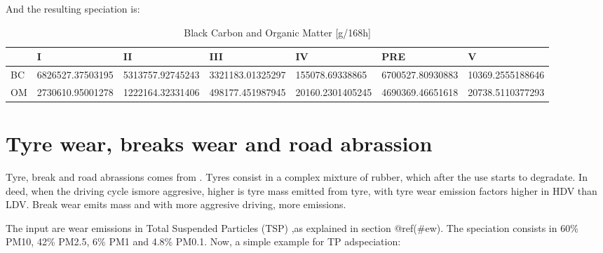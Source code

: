 \documentclass[12pt,graybox,envcountchap,sectrefs]{krantz}
\theoremstyle{definition}
\theoremstyle{definition}
\theoremstyle{definition}
\theoremstyle{remark}
\begin{document}
And the resulting speciation is:

\begin{table}

\caption{\label{tab:unnamed-chunk-96}Black Carbon and Organic Matter [g/168h]}
\centering
\begin{tabular}[t]{l|l|l|l|l|l|l}
\hline
  & I & II & III & IV & PRE & V\\
\hline
BC & 6826527.37503195 & 5313757.92745243 & 3321183.01325297 & 155078.69338865 & 6700527.80930883 & 10369.2555188646\\
\hline
OM & 2730610.95001278 & 1222164.32331406 & 498177.451987945 & 20160.2301405245 & 4690369.46651618 & 20738.5110377293\\
\hline
\end{tabular}
\end{table}

\section{Tyre wear, breaks wear and road
abrassion}\label{tyre-wear-breaks-wear-and-road-abrassion}

Tyre, break and road abrassions comes from
\citet{NtziachristosBoulter2009}. Tyres consist in a complex mixture of
rubber, which after the use starts to degradate. In deed, when the
driving cycle ismore aggresive, higher is tyre mass emitted from tyre,
with tyre wear emission factors higher in HDV than LDV. Break wear emits
mass and with more aggresive driving, more emissions.

The input are wear emissions in Total Suspended Particles (TSP) ,as
explained in section @ref(\#ew). The speciation consists in 60\% PM10,
42\% PM2.5, 6\% PM1 and 4.8\% PM0.1. Now, a simple example for TP
adspeciation:
\end{document}
